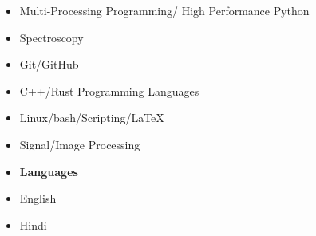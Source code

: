 
\vspace*{-0.4 cm}
\begin{multicols}{3}\raggedright %
    \begin{itemize}
        \item[\circ] Multi-Processing Programming/ High Performance Python 
        \item[\circ] Spectroscopy
        \item[\circ] Git/GitHub
      \end{itemize}
  \columnbreak
  
  \begin{itemize}
    \item[\circ] C++/Rust Programming Languages
    \item[\circ] Linux/bash/Scripting/\LaTeX
    \item[\circ] Signal/Image Processing
  \end{itemize}
  \columnbreak
  \begin{itemize}
    \item [] \textbf{Languages}
    \item[\circ] English
    \item[\circ] Hindi
  \end{itemize}
  \columnbreak
  
\end{multicols}